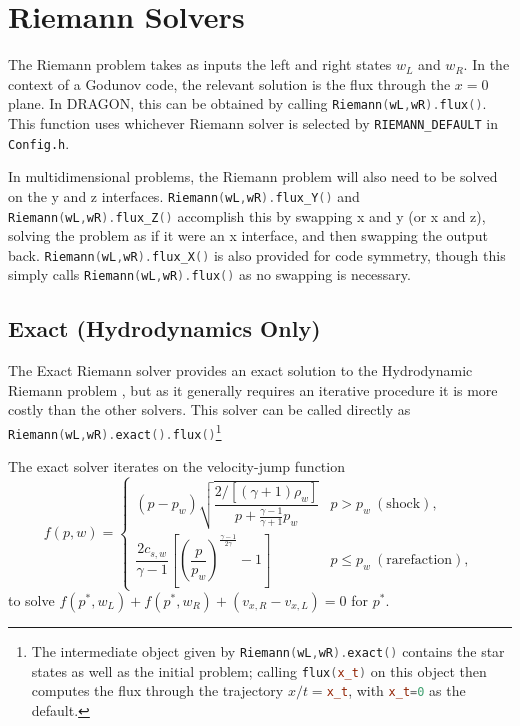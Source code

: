 \documentclass[11pt]{report}
\newcommand{\cpp}[1]{\lstinline[language=C++]{#1}}
\newcommand{\bash}[1]{\lstinline[language=bash]{#1}}
\begin{document}
\section{Riemann Solvers}\label{sec:riemann}

The Riemann problem takes as inputs the left and right states $w_L$ and $w_R$. In the context of a Godunov code, the relevant solution is the flux through the $x=0$ plane.
In DRAGON, this can be obtained by calling \cpp{Riemann(wL,wR).flux()}. This function uses whichever Riemann solver is selected by \cpp{RIEMANN_DEFAULT} in \bash{Config.h}.  

In multidimensional problems,  the Riemann problem will also need to be solved on the y and z interfaces.
 \cpp{Riemann(wL,wR).flux_Y()} and \cpp{Riemann(wL,wR).flux_Z()} accomplish this by swapping x and y (or x and z), solving the problem as if it were an x interface, and then swapping the output back.  \cpp{Riemann(wL,wR).flux_X()} is also provided for code symmetry, though this simply calls \cpp{Riemann(wL,wR).flux()} as no swapping is necessary.
 
 


\subsection{Exact (Hydrodynamics Only)} \label{sec:Riemann-exact}

The Exact Riemann solver provides an exact solution to the Hydrodynamic Riemann problem \citep{Toro2009}, but as it generally requires an iterative procedure it is more costly than the other solvers.
This solver can be called directly as \cpp{Riemann(wL,wR).exact().flux()}\footnote{The intermediate object given by \cpp{Riemann(wL,wR).exact()} contains the star states as well as the initial problem; calling \cpp{flux(x_t)} on this object then computes the flux through the trajectory $x/t=$\cpp{x_t}, with \cpp{x_t=0} as the default.}



The exact solver iterates on the velocity-jump function
\begin{equation}
f(p, w) =
\begin{cases}
(p - p_w)\sqrt{\dfrac{2/[(\gamma+1)\rho_w]}{p + \frac{\gamma-1}{\gamma+1}p_w}} & p > p_w \ (\text{shock}), \\[10pt]
\dfrac{2 c_{s,w}}{\gamma - 1}\left[\left(\dfrac{p}{p_w}\right)^{\frac{\gamma-1}{2\gamma}} - 1\right] & p \le p_w \ (\text{rarefaction}),
\end{cases}
\end{equation}
to solve $f(p^{*}, w_L) + f(p^{*}, w_R) + (v_{x,R} - v_{x,L}) = 0$ for $p^{*}$.
\end{document}
